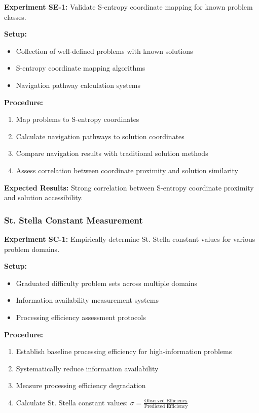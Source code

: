 \documentclass[11pt]{article}
\begin{document}
\textbf{Experiment SE-1:} Validate S-entropy coordinate mapping for known problem classes.

\textbf{Setup:}
\begin{itemize}
\item Collection of well-defined problems with known solutions
\item S-entropy coordinate mapping algorithms
\item Navigation pathway calculation systems
\end{itemize}

\textbf{Procedure:}
\begin{enumerate}
\item Map problems to S-entropy coordinates
\item Calculate navigation pathways to solution coordinates
\item Compare navigation results with traditional solution methods
\item Assess correlation between coordinate proximity and solution similarity
\end{enumerate}

\textbf{Expected Results:} Strong correlation between S-entropy coordinate proximity and solution accessibility.

\subsubsection{St. Stella Constant Measurement}

\textbf{Experiment SC-1:} Empirically determine St. Stella constant values for various problem domains.

\textbf{Setup:}
\begin{itemize}
\item Graduated difficulty problem sets across multiple domains
\item Information availability measurement systems
\item Processing efficiency assessment protocols
\end{itemize}

\textbf{Procedure:}
\begin{enumerate}
\item Establish baseline processing efficiency for high-information problems
\item Systematically reduce information availability
\item Measure processing efficiency degradation
\item Calculate St. Stella constant values: $\sigma = \frac{\text{Observed Efficiency}}{\text{Predicted Efficiency}}$
\end{enumerate}
\end{document}
